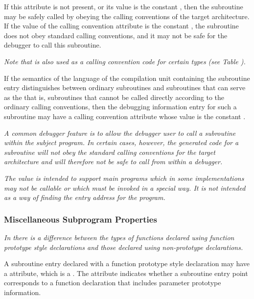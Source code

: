 If this attribute is not present, or its value is the constant
\DWCCnormalTARG, then the subroutine may be safely called by
obeying the  calling conventions of the target
architecture. If the value of the calling convention attribute
is the constant \DWCCnocallTARG, the subroutine does not obey
standard calling conventions, and it may not be safe for the
debugger to call this subroutine.

\textit{Note that \DWCCnormal{} is also used as a calling convention 
code for certain types 
(see Table ).}

If the semantics of the language of the compilation unit
containing the subroutine entry distinguishes between ordinary
subroutines and subroutines that can serve as the  that is, subroutines that cannot be called
directly according to the ordinary calling conventions,
then the debugging information entry for such a subroutine
may have a calling convention attribute whose value is the
constant \DWCCprogramTARG.

\textit{A common debugger feature is to allow the debugger user to call
a subroutine within the subject program. In certain cases,
however, the generated code for a subroutine will not obey
the standard calling conventions for the target architecture
and will therefore not be safe to call from within a debugger.}

\textit{The \DWCCprogram{} 
value is intended to support  main
programs which in some implementations may not be callable
or which must be invoked in a special way. It is not intended
as a way of finding the entry address for the program.}


\subsubsection{Miscellaneous Subprogram Properties}
\textit{In 
there is a difference between the types of functions
declared using function prototype style declarations and
those declared using non-prototype declarations.}

A subroutine entry declared with a function prototype style
declaration may have a
\DWATprototypedDEFN{} attribute, which is
a \CLASSflag. 
The attribute indicates whether a subroutine entry point corresponds
to a function declaration that includes parameter prototype information.

